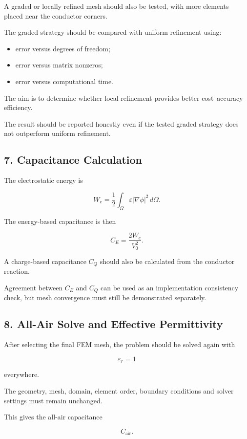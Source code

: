 A graded or locally refined mesh should also be tested, with more elements placed near the conductor corners.

The graded strategy should be compared with uniform refinement using:

\begin{itemize}
    \item error versus degrees of freedom;
    \item error versus matrix nonzeros;
    \item error versus computational time.
\end{itemize}

The aim is to determine whether local refinement provides better cost--accuracy efficiency.

The result should be reported honestly even if the tested graded strategy does not outperform uniform refinement.

\subsection*{7. Capacitance Calculation}

The electrostatic energy is

\[
W_e
=
\frac{1}{2}
\int_{\Omega}
\varepsilon
\left|
\nabla \phi
\right|^2
\, d\Omega.
\]

The energy-based capacitance is then

\[
C_E
=
\frac{2W_e}{V_0^2}.
\]

A charge-based capacitance \(C_Q\) should also be calculated from the conductor reaction.

Agreement between \(C_E\) and \(C_Q\) can be used as an implementation consistency check, but mesh convergence must still be demonstrated separately.

\subsection*{8. All-Air Solve and Effective Permittivity}

After selecting the final FEM mesh, the problem should be solved again with

\[
\varepsilon_r = 1
\]

everywhere.

The geometry, mesh, domain, element order, boundary conditions and solver settings must remain unchanged.

This gives the all-air capacitance

\[
C_{\mathrm{air}}.
\]

